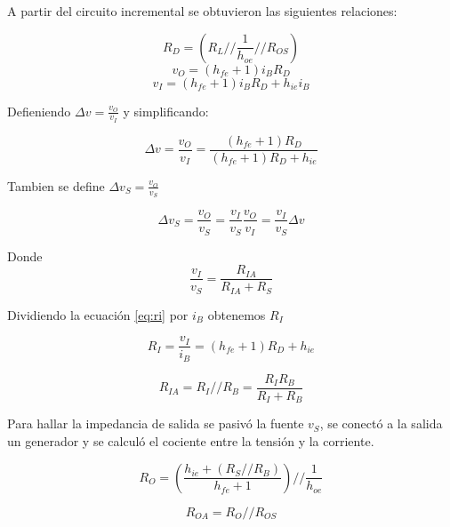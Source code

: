 \documentclass[../../main.tex]{subfiles}
\begin{document}
A partir del circuito incremental se obtuvieron las siguientes relaciones:

\begin{equation}
R_D=\left( R_{L} // \frac{1}{h_{oe}} // R_{OS} \right)
\end{equation}
\begin{equation}
v_{O}=\left( h_{fe} +1 \right) i_{B} R_D
\end{equation}
\begin{equation}
v_{I}=\left( h_{fe} +1 \right) i_{B} R_D + h_{ie} i_{B} \label{eq:ri}
\end{equation}



Defieniendo $\Delta v =\frac{v_O}{v_I}$ y simplificando:

\begin{equation}
\Delta v =\frac{v_O}{v_I}=\frac{\left( h_{fe} +1 \right) R_D}{\left( h_{fe} +1 \right) R_D + h_{ie} }
\end{equation}

Tambien se define  $\Delta v_S =\frac{v_O}{v_S}$

\begin{equation}
\Delta v_S =\frac{v_O}{v_S}=\frac{v_I}{v_S} \frac{v_O}{v_I} =\frac{v_I}{v_S}\Delta v 
\end{equation}

Donde
\begin{equation}
\frac{v_I}{v_S} = \frac{R_{IA}}{R_{IA}+R_S}
\end{equation}

Dividiendo la ecuación \ref{eq:ri} por $i_B$ obtenemos $R_I$

\begin{equation}
R_I=\frac{v_I}{i_B} = \left( h_{fe} +1 \right) R_D + h_{ie}
\end{equation}

\begin{equation}
R_{IA}= R_I // R_B=\frac{R_I R_B}{R_I + R_B}
\end{equation}

Para hallar la impedancia de salida se pasiv\'o la fuente $v_S$, se conectó a la salida un generador y se calculó el cociente entre la tensión y la corriente.

\begin{equation}
R_O=\left( \frac{h_{ie} + \left( R_S // R_B \right)}{h_{fe}+1} \right) // \frac{1}{h_{oe}}
\end{equation}

\begin{equation}
R_{OA}=R_O // R_{OS}
\end{equation}
\end{document}
